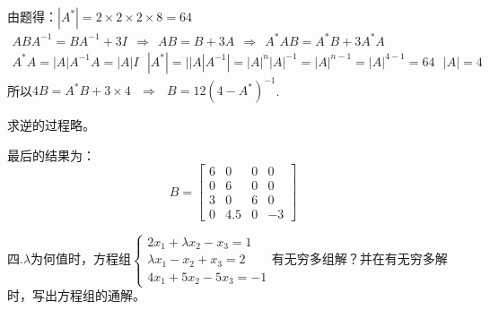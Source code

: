 \documentclass{article}
\begin{document}
\begin{jie}
由题得：$|A^*|=2\times2\times2\times8=64$
\begin{gather*}
ABA^{-1}=BA^{-1}+3I~~\Rightarrow~~AB=B+3A~~\Rightarrow~~A^*AB=A^*B+3A^*A\\
A^*A=|A|A^{-1}A=|A|I~~~|A^*|=||A|A^{-1}|=|A|^n|A|^{-1}=|A|^{n-1}=|A|^{4-1}=64~~~|A|=4
\end{gather*}
所以$4B=A^*B+3\times4~~~\Rightarrow~~~B=12(4-A^*)^{-1}$.

求逆的过程略。

最后的结果为：
\begin{equation*}
  B=\begin{bmatrix}
  6 & 0 & 0 & 0\\
  0 & 6 & 0 & 0\\
  3 & 0 & 6 & 0\\
  0 & 4.5 & 0 & -3
\end{bmatrix}
\end{equation*}
\end{jie}

四.$\lambda$为何值时，方程组$
\begin{cases}
 2x_{1}+\lambda x_{2}-x_{3}=1\\
 \lambda x_{1}-x_{2}+x_{3}=2\\
 4x_{1}+5 x_{2}-5x_{3}=-1
\end{cases}
$有无穷多组解？并在有无穷多解时，写出方程组的通解。
\end{document}
